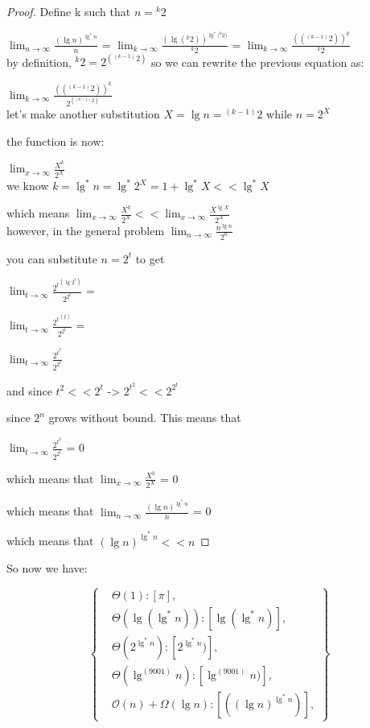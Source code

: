 \documentclass[11pt,fleqn]{article}
\theoremstyle{definition}
\theoremstyle{remark}
\begin{document}
\begin{proof} Define k such that $n = {}^k 2$
    
    $\lim_{n \to \infty} \frac{{(\lg n)}^{\lg^*{n}}}{n}$ =
    $\lim_{k \to \infty} \frac{{(\lg{({}^k 2)})}^{\lg^*{({}^k 2})}}{{}^k 2}$ =
    $\lim_{k \to \infty} \frac{{({({}^{(k-1)} 2)})}^{k}}{{}^k 2}$\\

    by definition, ${}^k 2 = 2^{({}^{(k-1)} 2)}$ so we can rewrite the 
    previous equation as:

    $\lim_{k \to \infty} \frac{{({({}^{(k-1)} 2)})}^{k}}{2^{({}^{(k-1)} 2)}}$\\

    let's make another substitution $X = \lg n = {}^{(k-1)} 2$ while $n = 2^X$

    the function is now:

    $\lim_{x \to \infty} \frac{{X}^{k}}{2^{X}}$\\

    we know $k = \lg^*n = \lg^*{2^X} = 1 + \lg^*X << \lg^*X$

    which means $\lim_{x \to \infty} \frac{{X}^{k}}{2^{X}} << \lim_{x \to \infty} \frac{{X}^{\lg{X}}}{2^{X}}$\\

    however, in the general problem $\lim_{n \to \infty} \frac{n^{\lg{n}}}{2^n}$
    
    you can substitute $n = 2^t$ to get

    $\lim_{t \to \infty} \frac{{2^t}^{(\lg{2^t})}}{2^{2^t}}$ =
    
    $\lim_{t \to \infty} \frac{{2^t}^{(t)}}{2^{2^t}}$ =

    $\lim_{t \to \infty} \frac{{2^{t^2}}}{2^{2^t}}$ 

    and since $t^2 << 2^t$ -> ${2^{t^2}} << 2^{2^t}$

    since $2^n$ grows without bound. This means that 
    
    $\lim_{t \to \infty} \frac{{2^{t^2}}}{2^{2^t}}$ = 0

    which means that $\lim_{x \to \infty} \frac{{X}^{k}}{2^{X}}$ = 0

    which means that $\lim_{n \to \infty} \frac{{(\lg n)}^{\lg^*{n}}}{n}$ = 0

    which means that ${(\lg n)}^{\lg^*{n}} << n$

    \end{proof}

So now we have:

\[
\left\{
\begin{aligned}
& \Theta(1): [\pi],\\
& \Theta(\lg(\lg^*n)): [\lg(\lg^*n)],\\
& \Theta(2^{\lg^*n}): [2^{\lg^*n})],\\
& \Theta(\lg^{(9001)} n): [\lg^{(9001)} n)],\\
& \mathcal{O}(n)+\Omega(\lg n): [({(\lg n)}^{\lg^*{n}})],
\end{aligned}
\right\}
\]\\
\end{document}
